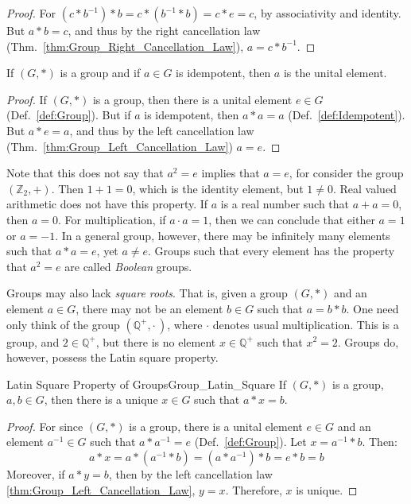     \begin{proof}
        For $(c*b^{\minus{1}})*b=c*(b^{\minus{1}}*b)=c*e=c$, by associativity
        and identity. But $a*b=c$, and thus by the right cancellation law
        (Thm.~\ref{thm:Group_Right_Cancellation_Law}), $a=c*b^{\minus{1}}$.
    \end{proof}
    \begin{theorem}
        If $(G,*)$ is a group and if $a\in{G}$ is idempotent, then $a$ is the
        unital element.
    \end{theorem}
    \begin{proof}
        If $(G,*)$ is a group, then there is a unital element $e\in{G}$
        (Def.~\ref{def:Group}). But if $a$ is idempotent, then $a*a=a$
        (Def.~\ref{def:Idempotent}). But $a*e=a$, and thus by the left
        cancellation law (Thm.~\ref{thm:Group_Left_Cancellation_Law}) $a=e$.
    \end{proof}
    Note that this does not say that $a^{2}=e$ implies that $a=e$, for consider
    the group $(\mathbb{Z}_{2},+)$. Then $1+1=0$, which is the identity element,
    but $1\ne{0}$. Real valued arithmetic does not have this property. If $a$ is
    a real number such that $a+a=0$, then $a=0$. For multiplication, if
    $a\cdot{a}=1$, then we can conclude that either $a=1$ or $a=\minus{1}$. In a
    general group, however, there may be infinitely many elements such that
    $a*a=e$, yet $a\ne{e}$. Groups such that every element has the property that
    $a^{2}=e$ are called \textit{Boolean} groups.
    \par\hfill\par
    Groups may also lack \textit{square roots}. That is,
    given a group $(G,*)$ and an element $a\in{G}$, there may not be an element
    $b\in{G}$ such that $a=b*b$. One need only think of the group
    $(\mathbb{Q}^{+},\cdot\,)$, where $\cdot$ denotes usual multiplication.
    This is a group, and $2\in\mathbb{Q}^{+}$, but there is no element
    $x\in\mathbb{Q}^{+}$ such that $x^{2}=2$. Groups do, however, possess the
    Latin square property.
    \begin{ltheorem}{Latin Square Property of Groups}{Group_Latin_Square}
        If $(G,*)$ is a group, $a,b\in{G}$, then there is a unique $x\in{G}$
        such that $a*x=b$.
    \end{ltheorem}
    \begin{proof}
        For since $(G,*)$ is a group, there is a unital element $e\in{G}$ and an
        element $a^{\minus{1}}\in{G}$ such that $a*a^{\minus{1}}=e$
        (Def.~\ref{def:Group}). Let $x=a^{\minus{1}}*b$. Then:
        \begin{equation}
            a*x=a*(a^{\minus{1}}*b)=(a*a^{\minus{1}})*b=e*b=b
        \end{equation}
        Moreover, if $a*y=b$, then by the left cancellation law
        \ref{thm:Group_Left_Cancellation_Law}, $y=x$. Therefore, $x$ is unique.
    \end{proof}
